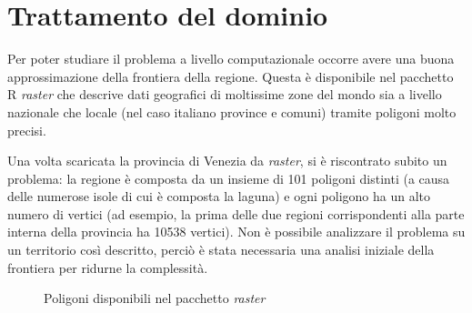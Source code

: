 \documentclass[a4paper,11pt,twoside,openright]{book}							%
\begin{document}
\section{Trattamento del dominio}

Per poter studiare il problema a livello computazionale occorre avere una buona approssimazione della frontiera della regione. Questa è disponibile nel pacchetto R \textit{raster} che descrive dati geografici di moltissime zone del mondo sia a livello nazionale che locale (nel caso italiano province e comuni) tramite poligoni molto precisi.

Una volta scaricata la provincia di Venezia da \textit{raster}, si è riscontrato subito un problema: la regione è composta da un insieme di 101 poligoni distinti (a causa delle numerose isole di cui è composta la laguna) e ogni poligono ha un alto numero di vertici (ad esempio, la prima delle due regioni corrispondenti alla parte interna della provincia ha 10538 vertici). Non è possibile analizzare il problema su un territorio così descritto, perciò è stata necessaria una analisi iniziale della frontiera per ridurne la complessità. 

\begin{figure}[t]
	\centering
	\caption{Poligoni disponibili nel pacchetto \textit{raster}}
	\label{fig:Ven_poligoni}
\end{figure}
\end{document}

